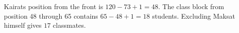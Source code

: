 Kairat\textquotesingle s position from the front is $120-73+1=48$. The class block from position 48 through 65 contains $65-48+1=18$ students. Excluding Maksat himself gives $\boxed{17}$ classmates.
